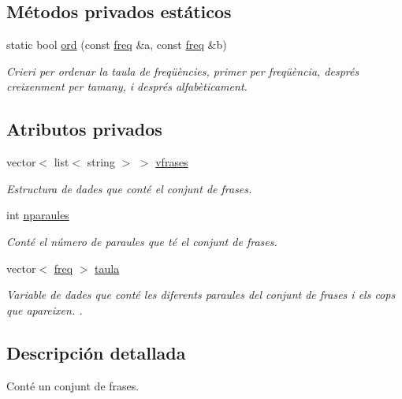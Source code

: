\subsection*{Métodos privados estáticos}
\begin{DoxyCompactItemize}
\item 
static bool \hyperlink{class_cjt___frases_a5b3109b7c405de618084f98dab67b74b}{ord} (const \hyperlink{struct_cjt___frases_1_1freq}{freq} \&a, const \hyperlink{struct_cjt___frases_1_1freq}{freq} \&b)
\begin{DoxyCompactList}\small\item\em Crieri per ordenar la taula de freqüències, primer per freqüència, després creixenment per tamany, i després alfabèticament. \end{DoxyCompactList}\end{DoxyCompactItemize}
\subsection*{Atributos privados}
\begin{DoxyCompactItemize}
\item 
vector$<$ list$<$ string $>$ $>$ \hyperlink{class_cjt___frases_a5323db427d06a961818c318d9ba79f3d}{vfrases}
\begin{DoxyCompactList}\small\item\em Estructura de dades que conté el conjunt de frases. \end{DoxyCompactList}\item 
int \hyperlink{class_cjt___frases_a026637b08f81acc25c6084146d73fc40}{nparaules}
\begin{DoxyCompactList}\small\item\em Conté el número de paraules que té el conjunt de frases. \end{DoxyCompactList}\item 
vector$<$ \hyperlink{struct_cjt___frases_1_1freq}{freq} $>$ \hyperlink{class_cjt___frases_a2b7318b7d64136bc71479278db6e103e}{taula}
\begin{DoxyCompactList}\small\item\em Variable de dades que conté les diferents paraules del conjunt de frases i els cops que apareixen. . \end{DoxyCompactList}\end{DoxyCompactItemize}


\subsection{Descripción detallada}
Conté un conjunt de frases. 

